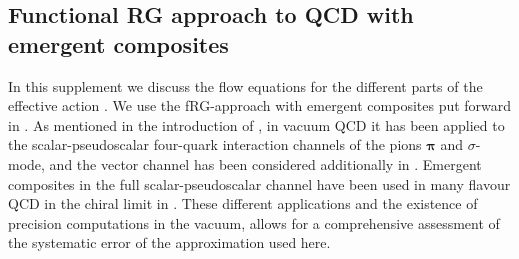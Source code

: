 \documentclass[reprint,twocolumn,superscriptaddress,preprintnumbers,amsmath,amssymb,aps,prd,floatfix]{revtex4-2}
\begin{document}
\subsection{Functional RG approach to QCD with emergent composites}
\label{app:flow_equation}

In this supplement we discuss the flow equations for the different parts of the effective action . We use the fRG-approach with emergent composites put forward in \cite{Gies:2001nw, Pawlowski:2005xe, Floerchinger:2009uf, Fu:2019hdw, Fukushima:2021ctq}. As mentioned in the introduction of , in vacuum QCD it has been applied to the scalar-pseudoscalar four-quark interaction channels of the pions  $\boldsymbol{\pi}$ and $\sigma$-mode, \cite{Gies:2002hq, Braun:2009ewx, Mitter:2014wpa, Braun:2014ata, Rennecke:2015eba, Cyrol:2017qkl, Ihssen:2024miv} and the vector channel has been considered additionally in \cite{Rennecke:2015eba}. Emergent composites in the full scalar-pseudoscalar channel have been used in many flavour QCD in the chiral limit in \cite{Goertz:2024dnz}. These different applications and the existence of precision computations in the vacuum, \cite{Mitter:2014wpa, Cyrol:2017qkl, Fu:2025hcm} allows for a comprehensive assessment of the systematic error of the approximation used here. 
\end{document}
